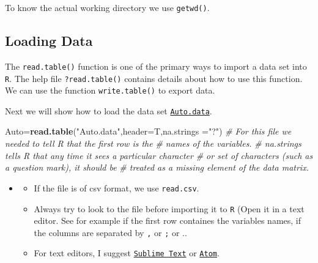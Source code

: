 \documentclass[]{book}
\newenvironment{Shaded}{\begin{snugshade}}{\end{snugshade}}
\newcommand{\KeywordTok}[1]{\textcolor[rgb]{0.13,0.29,0.53}{\textbf{#1}}}
\newcommand{\DataTypeTok}[1]{\textcolor[rgb]{0.13,0.29,0.53}{#1}}
\newcommand{\StringTok}[1]{\textcolor[rgb]{0.31,0.60,0.02}{#1}}
\newcommand{\CommentTok}[1]{\textcolor[rgb]{0.56,0.35,0.01}{\textit{#1}}}
\newcommand{\NormalTok}[1]{#1}
\providecommand{\tightlist}{%
  \setlength{\itemsep}{0pt}\setlength{\parskip}{0pt}}
\newenvironment{rmdblock}[1]
  {\begin{shaded*}
  \begin{itemize}
  \renewcommand{\labelitemi}{
    \raisebox{-.7\height}[0pt][0pt]{
      {\setkeys{Gin}{width=2em,keepaspectratio}\texttt{[image: img/icons/\#1]}}
    }
  }
  \item
  }
  {
  \end{itemize}
  \end{shaded*}
  }
\newenvironment{rmdinsight}
  {\begin{rmdblock}{insight}}
  {\end{rmdblock}}
\begin{document}
To know the actual working directory we use \texttt{getwd()}.

\subsection{Loading Data}\label{loading-data}

The \texttt{read.table()} function is one of the primary ways to import
a data set into \texttt{R}. The help file \texttt{?read.table()}
contains details about how to use this function. We can use the function
\texttt{write.table()} to export data.

Next we will show how to load the data set
\href{datasets/Auto.data}{\texttt{Auto.data}}.

\begin{Shaded}
\begin{Highlighting}[]
\NormalTok{Auto=}\KeywordTok{read.table}\NormalTok{(}\StringTok{"Auto.data"}\NormalTok{,}\DataTypeTok{header=}\NormalTok{T,}\DataTypeTok{na.strings =}\StringTok{"?"}\NormalTok{)}
\CommentTok{# For this file we needed to tell R that the first row is the}
\CommentTok{# names of the variables.}
\CommentTok{# na.strings tells R that any time it sees a particular character}
\CommentTok{# or set of characters (such as a question mark), it should be}
\CommentTok{# treated as a missing element of the data matrix. }
\end{Highlighting}
\end{Shaded}

\begin{rmdinsight}
\begin{itemize}
\tightlist
\item
  If the file is of csv format, we use \texttt{read.csv}.
\item
  Always try to look to the file before importing it to \texttt{R} (Open
  it in a text editor. See for example if the first row containes the
  variables names, if the columns are separated by \texttt{,} or
  \texttt{;} or ..
\item
  For text editors, I suggest
  \href{https://www.sublimetext.com/}{\texttt{Sublime\ Text}} or
  \href{https://atom.io/}{\texttt{Atom}}.
\end{itemize}
\end{rmdinsight}
\end{document}
